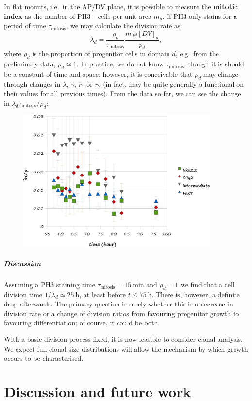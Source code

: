\documentclass[10pt,english]{report}
\begin{document}
In flat mounts, i.e.\ in the AP/DV plane, it is possible to measure the \textbf{mitotic index} as the number of PH3+ cells per unit area $m_d$. If PH3 only stains for a period of time $\tau_\textrm{mitosis}$, we may calculate the division rate as $$\lambda_d = \frac{\rho_d}{\tau_\textrm{mitosis}}\frac{m_d s [DV]_d}{p_d},$$ where $\rho_d$ is the proportion of progenitor cells in domain $d$, e.g.\ from the preliminary data, $\rho_d \simeq 1$. In practice, we do not know $\tau_\textrm{mitosis}$, though it is should be a constant of time and space; however, it is conceivable that $\rho_d$ may change through changes in $\lambda$, $\gamma$, $r_1$ or $r_2$ (in fact, may be quite generally a functional on their values for all previous times). From the data so far, we can see the change in $\lambda_d \tau_\textrm{mitosis} / \rho_d$:

\begin{figure}[h]
	\begin{center}
		\includegraphics[width=4in]{consistency-mitotic-index.png}
	\end{center}
\end{figure}

\paragraph{Discussion}

Assuming a PH3 staining time $\tau_\textrm{mitosis} = \SI{15}{\minute}$ and $\rho_d = 1$ we find that a cell division time $1/\lambda_d \simeq \SI{25}{\hour}$, at least before $t \le \SI{75}{\hour}$. There is, however, a definite drop afterwards. The primary question is surely whether this is a decrease in division rate or a change of division ratios from favouring progenitor growth to favouring differentiation; of course, it could be both.

With a basic division process fixed, it is now feasible to consider clonal analysis. We expect full clonal size distributions will allow the mechanism by which growth occurs to be characterised.




\chapter{\label{ch:conclusion}Discussion and future work}


\newpage
{}
\renewcommand\bibname{References}
%
\printbibliography[]
\end{document}
